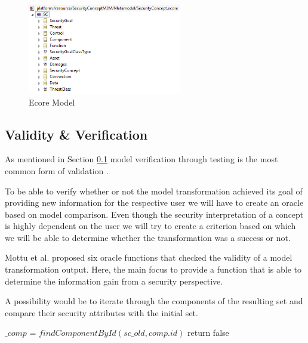 \begin{figure}[H]
\centering
\includegraphics[width=0.6\textwidth]{pictures/ecore}
\caption{Ecore Model}
\end{figure}

\subsection{Validity \& Verification}
\label{subsec:validation}

As mentioned in Section \ref{subsec:validation} model verification through testing is the most common form of validation \cite{fleurey}.

To be able to verify whether or not the model transformation achieved its goal of providing new information for the respective user we will have to create an oracle based on model comparison. Even though the security interpretation of a concept is highly dependent on the user we will try to create a criterion based on which we will be able to determine whether the transformation was a success or not.

Mottu et al. \cite{mottu} proposed six oracle functions that checked the validity of a model transformation output. Here, the main focus to provide a function that is able to determine the information gain from a security perspective.

A possibility would be to iterate through the components of the resulting set and compare their security attributes with the initial set.

\begin{algorithm}[H]
\begin{algorithmic}
\State $\_comp$ = $findComponentById(sc\_old, comp.id)$
return false
\EndIf
\EndFor
\EndFor
\EndFunction
\end{algorithmic}
\end{algorithm}

